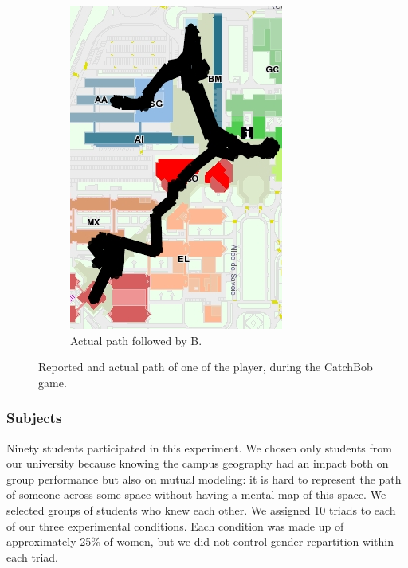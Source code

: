 \documentclass[twocolumn]{article}
\begin{document}
\begin{figure}[h!t]
\begin{subfigure}{.3\textwidth}
            \includegraphics[width=\linewidth]{image7.png}
            \caption{Actual path followed by B.}
        \end{subfigure}
        \caption{Reported and actual path of one of the player, during the {\sc
        CatchBob} game.}
        \label{study2:paths}
\end{figure}

\subsubsection*{Subjects}

Ninety students participated in this experiment. We chosen only students from
our university because knowing the campus geography had an impact both on group
performance but also on mutual modeling: it is hard to represent the path of
someone across some space without having a mental map of this space. We selected
groups of students who knew each other. We assigned 10 triads to each of our
three experimental conditions. Each condition was made up of approximately 25\%
of women, but we did not control gender repartition within each triad.
\end{document}
